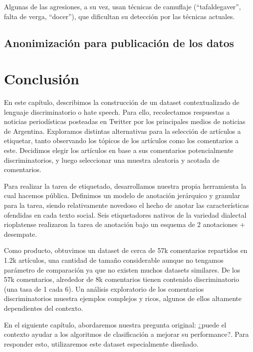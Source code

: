 Algunas de las agresiones, a su vez, usan técnicas de camuflaje (``tafaldegaver'', falta de verga, ``docer''), que dificultan su detección por las técnicas actuales.





\subsection{Anonimización para publicación de los datos}



\section{Conclusión}

En este capítulo, describimos la construcción de un dataset contextualizado de lenguaje discriminatorio o hate speech. Para ello, recolectamos respuestas a noticias periodísticas posteadas en Twitter por los principales medios de noticias de Argentina. Exploramos distintas alternativas para la selección de artículos a etiquetar, tanto observando los tópicos de los artículos como los comentarios a este. Decidimos elegir los artículos en base a sus comentarios potencialmente discriminatorios, y luego seleccionar una muestra aleatoria y acotada de comentarios.

Para realizar la tarea de etiquetado, desarrollamos nuestra propia herramienta la cual hacemos pública. Definimos un modelo de anotación jerárquico y granular para la tarea, siendo relativamente novedoso el hecho de anotar las características ofendidas en cada texto social. Seis etiquetadores nativos de la variedad dialectal rioplatense realizaron la tarea de anotación bajo un esquema de 2 anotaciones + desempate.

Como producto, obtuvimos un dataset de cerca de 57k comentarios repartidos en 1.2k artículos, una cantidad de tamaño considerable aunque no tengamos parámetro de comparación ya que no existen muchos datasets similares. De los 57k comentarios, alrededor de 8k comentarios tienen contenido discriminatorio (una tasa de 1 cada 6). Un análisis exploratorio de los comentarios discriminatorios muestra ejemplos complejos y ricos, algunos de ellos altamente dependientes del contexto.

En el siguiente capítulo, abordaremos nuestra pregunta original: ¿puede el contexto ayudar a los algoritmos de clasificación a mejorar su performance?. Para responder esto, utilizaremos este dataset especialmente diseñado.
